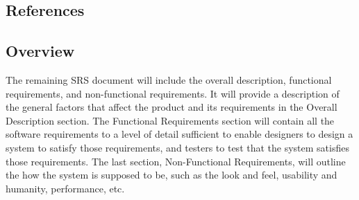 \documentclass[titlepage]{article}
\begin{document}
\subsection{References}
\subsection{Overview}
The remaining SRS document will include the overall description, functional requirements, and non-functional requirements. It will provide a description of the general factors that affect the product and its requirements in the Overall Description section. The Functional Requirements section will contain all the software requirements to a level of detail sufficient to enable designers to design a system to satisfy those requirements, and testers to test that the system satisfies those requirements. The last section, Non-Functional Requirements, will outline the how the system is supposed to be, such as the look and feel, usability and humanity, performance, etc. 
\end{document}

